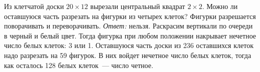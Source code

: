 \problem{}
Из клетчатой доски $20 \times 12$ вырезали центральный квадрат $2 \times 2$.
Можно ли оставшуюся часть разрезать на фигурки
из четырех клеток?
Фигурки разрешается поворачивать и переворачивать.
\solution
\emph{Ответ:} нельзя.
Раскрасим вертикали по очереди в черный и белый цвет.
Тогда фигурка при любом положении накрывает нечетное число белых клеток:
3 или 1.
Оставшуюся часть доски из 236 оставшихся клеток надо разрезать на 59 фигурок.
В них войдет нечетное число белых клеток, тогда как осталось
128 белых клеток~--- число четное.
\endproblem
